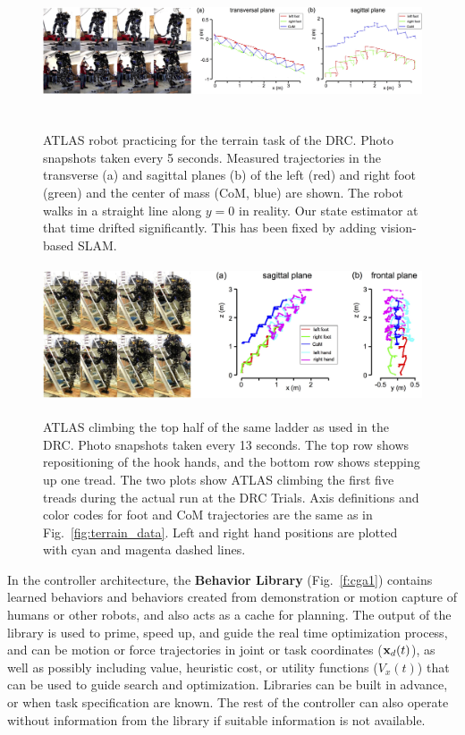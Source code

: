 \documentclass[letterpaper,12pt,fullpage]{article}
\begin{document}
\begin{figure}[t]
  \begin{center}
    {\includegraphics[height=3.8cm]{Figures/atlas_terrain}}
    \caption{ATLAS robot practicing for the terrain task of the DRC. Photo snapshots taken every 5 seconds. Measured trajectories in the transverse (a) and sagittal planes (b) of the left (red) and right foot (green) and the center of mass (CoM, blue) are shown. The robot walks in a straight line along $y=0$ in reality. Our state estimator at that time drifted significantly. This has been fixed by adding vision-based SLAM.
      }\label{fig:terrain_data} 
\label{fig:terrain_pic} 
  \end{center}
\end{figure}   


\begin{figure}[t]
  \begin{center}
    {\includegraphics[height=4cm]{Figures/atlas_ladder}}
    \caption{
      ATLAS climbing the top half of the same 
      ladder as used in the DRC. Photo snapshots taken every 13 seconds. The
      top row shows repositioning of the hook hands, and the bottom row shows
      stepping up one tread.
      The two plots show ATLAS climbing the first five treads during
      the actual run at the DRC Trials. Axis definitions and color codes for foot and CoM trajectories are the same as in Fig.~\ref{fig:terrain_data}. Left and right hand positions are plotted with cyan and magenta dashed lines. 
      }\label{fig:ladder_data} 
\label{fig:ladder_pic} 
  \end{center}
\end{figure}    

In the controller architecture, the {\bf Behavior Library} (Fig.~\ref{f:cga1}) contains
learned behaviors and behaviors created from demonstration or
motion capture of humans or other robots, and also acts as a cache
for planning. The output of the library is used to prime, speed up,
and guide the real time optimization process, and can be motion
or force trajectories in joint or task coordinates (${\bf x}_d(t)$), as well as
possibly including value, heuristic cost, or utility functions ($V_x(t)$)
that can be used
to guide search and optimization. 
Libraries can be built in advance, or when task specification are known.
The rest of the controller can
also operate without information from the library if suitable information
is not available.
\end{document}

